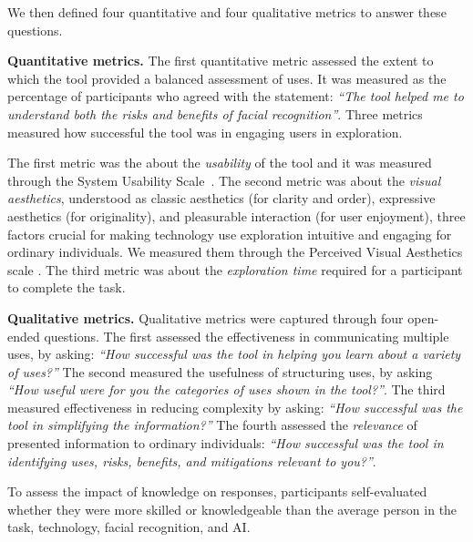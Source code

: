 We then defined four quantitative and four qualitative metrics to answer these questions. 

\smallskip
\noindent\textbf{Quantitative metrics.}
The first quantitative metric assessed the extent to which the tool provided a balanced assessment of uses. It was measured as the percentage of participants who agreed with the statement: \emph{``The tool helped me to understand both the risks and benefits of facial recognition''}. Three metrics measured how successful the tool was in engaging users in exploration. 

The first metric was the about the \emph{usability} of the tool and it was measured through the System Usability Scale~\cite{brooke1996sus}. The second metric was about the \emph{visual aesthetics}, understood as classic aesthetics (for clarity and order), expressive  aesthetics (for originality), and pleasurable interaction (for user enjoyment), three factors crucial for making technology use exploration intuitive and engaging for ordinary individuals. We measured them through the Perceived Visual Aesthetics scale \cite{Lavie2004}. The third metric was about the \emph{exploration time} required for a participant to complete the task.

\smallskip
\noindent \textbf{Qualitative metrics.}
Qualitative metrics were captured through four open-ended questions. The first assessed the effectiveness in communicating multiple uses, by asking: \emph{``How successful was the tool in helping you learn about a variety of uses?''} The second measured the usefulness of structuring uses, by asking \emph{``How useful were for you the categories of uses shown in the tool?''}. The third measured effectiveness in reducing complexity by asking: \emph{``How successful was the tool in simplifying the information?''} The fourth assessed the \emph{relevance} of presented information to ordinary individuals: \emph{``How successful was the tool in identifying uses, risks, benefits, and mitigations relevant to you?''}. 

To assess the impact of knowledge on responses, participants self-evaluated whether they were more skilled or knowledgeable than the average person in the task, technology, facial recognition, and AI.
    
